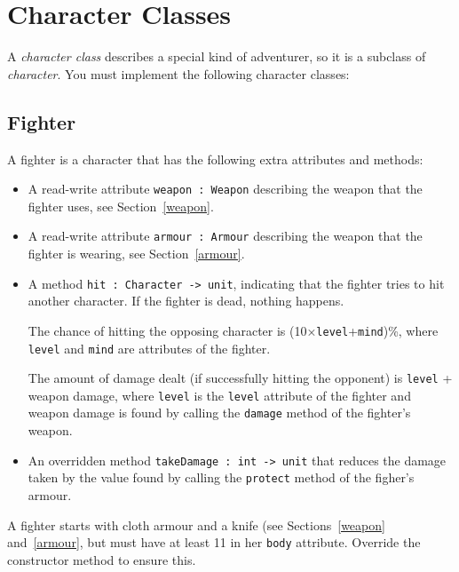 \documentclass[a4paper]{article}
\begin{document}
\section{Character Classes}

A \emph{character class} describes a special kind of adventurer, so it
is a subclass of \emph{character}.  You must implement the following
character classes:

\subsection{Fighter}

A fighter is a character that has the following extra attributes and
methods:

\begin{itemize}

\item A read-write attribute \texttt{weapon : Weapon} describing the
  weapon that the fighter uses, see Section~\ref{weapon}.

\item A read-write attribute \texttt{armour : Armour} describing the
  weapon that the fighter is wearing, see Section~\ref{armour}.

\item A method \texttt{hit : Character -> unit}, indicating that the
  fighter tries to hit another character.  If the fighter is dead,
  nothing happens.

The chance of hitting the opposing character is
(10×\texttt{level}+\texttt{mind})\%, where \texttt{level} and
\texttt{mind} are attributes of the fighter.

The amount of damage dealt (if successfully hitting the opponent) is
\texttt{level} + weapon damage, where \texttt{level} is the
\texttt{level} attribute of the fighter and weapon damage is found by
calling the \texttt{damage} method of the fighter's weapon.

\item An overridden method \texttt{takeDamage : int -> unit} that
  reduces the damage taken by the value found by calling the
  \texttt{protect} method of the figher's armour.

\end{itemize}

\noindent
A fighter starts with cloth armour and a knife (see
Sections~\ref{weapon} and~\ref{armour}, but must have at least 11 in
her \texttt{body} attribute.  Override the constructor method to
ensure this.
\end{document}
